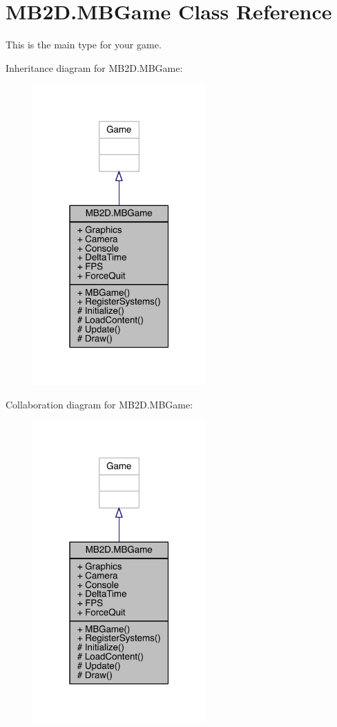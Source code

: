 \hypertarget{class_m_b2_d_1_1_m_b_game}{}\section{M\+B2\+D.\+M\+B\+Game Class Reference}
\label{class_m_b2_d_1_1_m_b_game}


This is the main type for your game.  




Inheritance diagram for M\+B2\+D.\+M\+B\+Game\+:
\nopagebreak
\begin{figure}[H]
\begin{center}
\leavevmode
\includegraphics[width=187pt]{class_m_b2_d_1_1_m_b_game__inherit__graph}
\end{center}
\end{figure}


Collaboration diagram for M\+B2\+D.\+M\+B\+Game\+:
\nopagebreak
\begin{figure}[H]
\begin{center}
\leavevmode
\includegraphics[width=187pt]{class_m_b2_d_1_1_m_b_game__coll__graph}
\end{center}
\end{figure}
